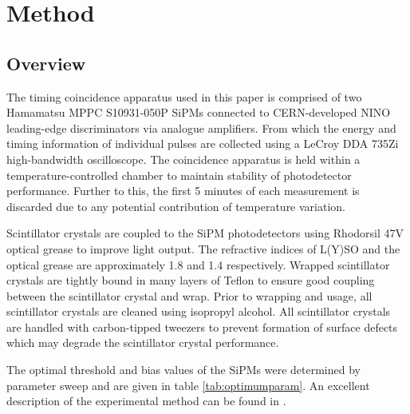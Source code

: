 \section{Method}
\label{sec:method}
\subsection{Overview}
The timing coincidence apparatus used in this paper is comprised of two Hamamatsu MPPC S10931-050P SiPMs connected to CERN-developed NINO leading-edge discriminators via analogue amplifiers. From which the energy and timing information of individual pulses are collected using a LeCroy DDA 735Zi high-bandwidth oscilloscope. The coincidence apparatus is held within a temperature-controlled chamber to maintain stability of photodetector performance. Further to this, the first 5 minutes of each measurement is discarded due to any potential contribution of temperature variation.

Scintillator crystals are coupled to the SiPM photodetectors using Rhodorsil 47V optical grease to improve light output. The refractive indices of L(Y)SO and the optical grease are approximately 1.8 \cite{Erdei2012} and 1.4 \cite{rhodorsilgrease} respectively. Wrapped scintillator crystals are tightly bound in many layers of Teflon to ensure good coupling between the scintillator crystal and wrap. Prior to wrapping and usage, all scintillator crystals are cleaned using isopropyl alcohol. All scintillator crystals are handled with carbon-tipped tweezers to prevent formation of surface defects which may degrade the scintillator crystal performance. 

The optimal threshold and bias values of the SiPMs were determined by parameter sweep and are given in table \ref{tab:optimumparam}. An excellent description of the experimental method can be found in \cite{ch_Meyer_Pizzichemi_Lecoq_2013}.
